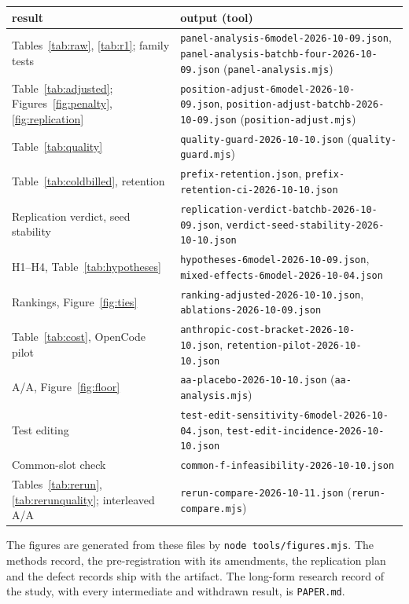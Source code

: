 \documentclass[10pt]{article}
\newenvironment{inlinetable}{\par\medskip\noindent\begin{minipage}{\linewidth}\centering\small}{\end{minipage}\par\bigskip}
\begin{document}
\begin{appendices}
\begin{inlinetable}
\label{tab:files}
\begin{tabular}{@{}L{5.6cm}L{10.4cm}@{}}
\toprule
result & output (tool) \\
\midrule
Tables~\ref{tab:raw}, \ref{tab:r1}; family tests & \texttt{panel-analysis-6model-2026-10-09.json}, \texttt{panel-analysis-batchb-four-2026-10-09.json} (\texttt{panel-analysis.mjs}) \\
Table~\ref{tab:adjusted}; Figures~\ref{fig:penalty}, \ref{fig:replication} & \texttt{position-adjust-6model-2026-10-09.json}, \texttt{position-adjust-batchb-2026-10-09.json} (\texttt{position-adjust.mjs}) \\
Table~\ref{tab:quality} & \texttt{quality-guard-2026-10-10.json} (\texttt{quality-guard.mjs}) \\
Table~\ref{tab:coldbilled}, retention & \texttt{prefix-retention.json}, \texttt{prefix-retention-ci-2026-10-10.json} \\
Replication verdict, seed stability & \texttt{replication-verdict-batchb-2026-10-09.json}, \texttt{verdict-seed-stability-2026-10-10.json} \\
H1--H4, Table~\ref{tab:hypotheses} & \texttt{hypotheses-6model-2026-10-09.json}, \texttt{mixed-effects-6model-2026-10-04.json} \\
Rankings, Figure~\ref{fig:ties} & \texttt{ranking-adjusted-2026-10-10.json}, \texttt{ablations-2026-10-09.json} \\
Table~\ref{tab:cost}, OpenCode pilot & \texttt{anthropic-cost-bracket-2026-10-10.json}, \texttt{retention-pilot-2026-10-10.json} \\
A/A, Figure~\ref{fig:floor} & \texttt{aa-placebo-2026-10-10.json} (\texttt{aa-analysis.mjs}) \\
Test editing & \texttt{test-edit-sensitivity-6model-2026-10-04.json}, \texttt{test-edit-incidence-2026-10-10.json} \\
Common-slot check & \texttt{common-f-infeasibility-2026-10-10.json} \\
Tables~\ref{tab:rerun}, \ref{tab:rerunquality}; interleaved A/A & \texttt{rerun-compare-2026-10-11.json} (\texttt{rerun-compare.mjs}) \\
\bottomrule
\end{tabular}
\end{inlinetable}

The figures are generated from these files by \texttt{node tools/figures.mjs}. The methods record,
the pre-registration with its amendments, the replication plan and the defect records ship with the
artifact. The long-form research record of the study, with every intermediate and withdrawn result, is
\texttt{PAPER.md}.


\end{appendices}
\end{document}
